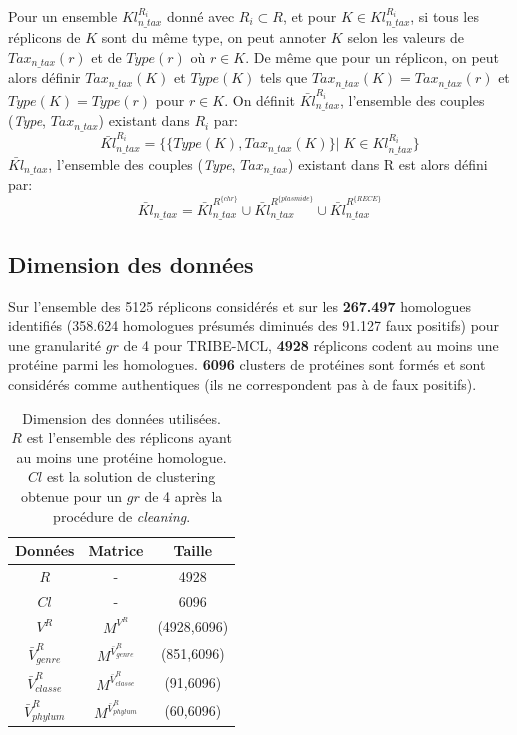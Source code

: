 Pour un ensemble $Kl_{n\_tax}^{R_{i}}$ donné avec $R_{i} \subset R$, et pour $K \in Kl_{n\_tax}^{R_{i}} $, si tous les réplicons de $K$ sont du même type, on peut annoter $K$ selon les valeurs de $Tax_{n\_tax}(r)$ et de $Type(r)$ où $r \in K$. De même que pour un réplicon, on peut alors définir $Tax_{n\_tax}(K)$ et $Type(K)$ tels que $Tax_{n\_tax}(K)=Tax_{n\_tax}(r)$ et $Type(K)=Type(r)$ pour $r \in K$. On définit $\bar{Kl}_{n\_tax}^{R_{i}}$, l'ensemble des couples (\textit{Type}, $Tax_{n\_tax}$) existant dans $R_{i}$ par:
	\begin{equation}
	\bar{Kl}_{n\_tax}^{R_{i}} =\Big\{ \{Type(K) , Tax_{n\_tax}(K)\} |\;K \in  Kl_{n\_tax}^{R_{i}}\Big\}
	\end{equation}
$\bar{Kl}_{n\_tax}$, l'ensemble des couples (\textit{Type}, $Tax_{n\_tax}$) existant dans R est alors défini par:
	\begin{equation}
	\bar{Kl}_{n\_tax}=\bar{Kl}_{n\_tax}^{R^{ \{chr\} }} \cup \bar{Kl}_{n\_tax}^{R^{ \{plasmide\} }} \cup \bar{Kl}_{n\_tax}^{R^{ \{RECE\} }} 
	\end{equation}
	
  \subsection{Dimension des données}    
Sur l'ensemble des 5125 réplicons considérés et sur les \textbf{267.497} homologues identifiés (358.624 homologues présumés diminués des 91.127 faux positifs) pour une granularité $gr$ de 4 pour TRIBE-MCL, \textbf{4928} réplicons codent au moins une protéine parmi les homologues. \textbf{6096} clusters de protéines sont formés et sont considérés comme authentiques (ils ne correspondent pas à de faux positifs).

\begin{table}[H]
 	\caption[Dimension des données utilisées]{Dimension des données utilisées.\\ $R$ est l'ensemble des réplicons ayant au moins une protéine homologue. $Cl$ est la solution de clustering obtenue pour un $gr$ de 4 après la procédure de \textit{cleaning}.} 
	\begin{center}
 	\begin{tabular}{c|c|c}
 	\textbf{Données} & \textbf{Matrice} & \textbf{Taille}\\
	\hline
	$R$ & - & 4928\\
	$Cl$ & - & 6096\\
	$V^{R}$ & $M^{V^{R}}$ & (4928,6096)\\
	$\bar{V}^{R}_{genre}$ & $M^{\bar{V}^{R}_{genre}}$ & (851,6096)\\
	$\bar{V}^{R}_{classe}$ & $M^{\bar{V}^{R}_{classe}}$ & (91,6096)\\
	$\bar{V}^{R}_{phylum}$ & $M^{\bar{V}^{R}_{phylum}}$ & (60,6096)\\
	\end{tabular}
	\end{center}
\end{table}
    
